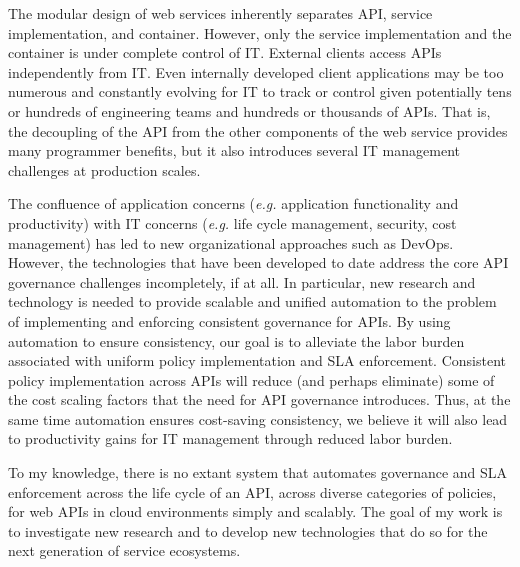 \documentclass[10pt]{article}
\begin{document}
The modular design of web services inherently separates API, 
service implementation, and container. However, only 
the service implementation and the container is under complete
control of IT. External clients access APIs independently from IT.
Even internally developed client applications may be too numerous and
constantly evolving for IT to track or control given
potentially tens or hundreds of engineering teams and hundreds or 
thousands of APIs.  That is, the decoupling of the API from the 
other components of the web service provides many programmer
benefits, but it also introduces several IT management challenges 
at production scales. 

The confluence of application concerns ({\em e.g.} 
application functionality and productivity) with IT 
concerns ({\em e.g.} life cycle management, security, 
cost management) has led to new organizational approaches such as
DevOps.  However, 
the technologies that have been developed
to date address the core API
governance challenges incompletely, if at all. 
In particular, new research and technology is needed 
to provide scalable and unified automation to the problem
of implementing and enforcing consistent governance for APIs. 
By using automation to ensure consistency, our goal is to alleviate the 
labor burden associated with uniform policy implementation and SLA enforcement.  
Consistent policy implementation across APIs will reduce (and perhaps
eliminate) some of the cost scaling factors that the need for API governance
introduces.  Thus, at the same time automation ensures cost-saving
consistency, we believe it will also lead to productivity gains for 
IT management through reduced labor burden.

To my knowledge, there is no extant system that automates governance and
SLA enforcement across the life cycle
of an API, across diverse categories of policies, for web
APIs in cloud environments simply and scalably.  The goal of my work is to investigate 
new research and to develop
new technologies that do so for the next generation of service ecosystems.
\end{document}
